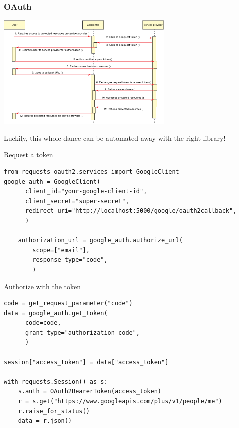 \documentclass{beamer}
\begin{document}
\begin{frame}
  \frametitle{OAuth}
  \begin{center}
    \includegraphics[width=320]{img/oauth-seq.png}
  \end{center}
\end{frame}


\begin{frame}[fragile=singleslide]
  Luckily, this whole dance can be automated away with the right library!
  \begin{block}{Request a token}
    {\tiny
    \begin{Verbatim}
from requests_oauth2.services import GoogleClient
google_auth = GoogleClient(
      client_id="your-google-client-id",
      client_secret="super-secret",
      redirect_uri="http://localhost:5000/google/oauth2callback",
      )

    authorization_url = google_auth.authorize_url(
        scope=["email"],
        response_type="code",
        )
    \end{Verbatim}
    }
  \end{block}
  \begin{block}{Authorize with the token}
    {\tiny
    \begin{Verbatim}
code = get_request_parameter("code")
data = google_auth.get_token(
      code=code,
      grant_type="authorization_code",
      )

session["access_token"] = data["access_token"]

with requests.Session() as s:
    s.auth = OAuth2BearerToken(access_token)
    r = s.get("https://www.googleapis.com/plus/v1/people/me")
    r.raise_for_status()
    data = r.json()
\end{Verbatim}
    }
  \end{block}
\end{frame}
\end{document}
